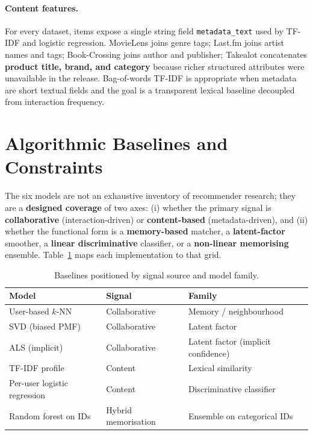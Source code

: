 \paragraph{Content features.}
For every dataset, items expose a single string field \texttt{metadata\_text} used by TF-IDF and logistic regression. MovieLens joins genre tags; Last.fm joins artist names and tags; Book-Crossing joins author and publisher; Takealot concatenates \textbf{product title, brand, and category} because richer structured attributes were unavailable in the release. Bag-of-words TF-IDF is appropriate when metadata are short textual fields and the goal is a transparent lexical baseline decoupled from interaction frequency.

\section{Algorithmic Baselines and Constraints}
\label{sec:method_baselines}

The six models are not an exhaustive inventory of recommender research; they are a \textbf{designed coverage} of two axes: (i) whether the primary signal is \textbf{collaborative} (interaction-driven) or \textbf{content-based} (metadata-driven), and (ii) whether the functional form is a \textbf{memory-based} matcher, a \textbf{latent-factor} smoother, a \textbf{linear discriminative} classifier, or a \textbf{non-linear memorising} ensemble. Table~\ref{tab:model_design_grid} maps each implementation to that grid.

\begin{table}[htbp]
  \centering
  \caption{Baselines positioned by signal source and model family.}
  \label{tab:model_design_grid}
  \begin{tabular}{@{}l l l@{}}
    \toprule
    \textbf{Model} & \textbf{Signal} & \textbf{Family} \\
    \midrule
    User-based $k$-NN & Collaborative & Memory / neighbourhood \\
    SVD (biased PMF) & Collaborative & Latent factor \\
    ALS (implicit) & Collaborative & Latent factor (implicit confidence) \\
    TF-IDF profile & Content & Lexical similarity \\
    Per-user logistic regression & Content & Discriminative classifier \\
    Random forest on IDs & Hybrid memorisation & Ensemble on categorical IDs \\
    \bottomrule
  \end{tabular}
\end{table}

